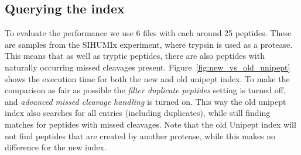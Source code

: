 \documentclass[11pt]{article}
\newenvironment{Figure}
{\par\medskip\noindent\minipage{\linewidth}}
{\endminipage\par\medskip}
\begin{document}
\begin{multicols}{2}
        \subsection{Querying the index}
        To evaluate the performance we use 6 files with each around 25 peptides.
        These are samples from the SIHUMIx experiment, where trypsin is used as a protease.
        This means that as well as tryptic peptides, there are also peptides with naturally occurring missed cleavages present.
        Figure~\ref{fig:new_vs_old_unipept} shows the execution time for both the new and old unipept index.
        To make the comparison as fair as possible the \textit{filter duplicate peptides} setting is turned off, and \textit{advanced missed cleavage handling} is turned on.
        This way the old unipept index also searches for all entries (including duplicates), while still finding matches for peptides with missed cleavages.
        Note that the old Unipept index will not find peptides that are created by another protease, while this makes no difference for the new index.
        \begin{Figure}
            \centering
\end{Figure}
\end{multicols}
\end{document}
